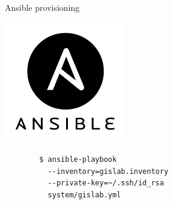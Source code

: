 \documentclass[12pt]{beamer}
\begin{document}
\begin{frame}[fragile]{Ansible provisioning}
	\begin{center}
		\includegraphics[keepaspectratio=true,height=0.4\textheight]{images/ansible.png}
	\end{center}

   \lstset{language=sh}
	\begin{lstlisting}
		$ ansible-playbook
		  --inventory=gislab.inventory
		  --private-key=~/.ssh/id_rsa
		  system/gislab.yml
	\end{lstlisting}
\end{frame}
\end{document}
